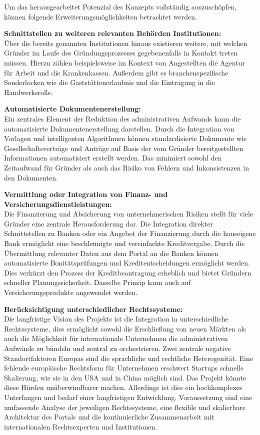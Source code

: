 Um das herausgearbeitet Potenzial des Konzepts vollständig auszuschöpfen, können folgende Erweiterungsmöglichkeiten betrachtet werden.

\textbf{Schnittstellen zu weiteren relevanten Behörden Institutionen:} \\
Über die bereits genannten Institutionen hinaus existieren weitere, mit welchen Gründer im Laufe des Gründungsprozesses gegebenenfalls in Kontakt treten müssen.
Hierzu zählen beispielsweise im Kontext von Angestellten die Agentur für Arbeit und die Krankenkassen.
Außerdem gibt es branchenspezifische Sonderlocken wie die Gaststättenerlaubnis und die Eintragung in die Handwerksrolle.

\textbf{Automatisierte Dokumentenerstellung:} \\
Ein zentrales Element der Reduktion des administrativen Aufwands kann die automatisierte Dokumentenerstellung darstellen.
Durch die Integration von Vorlagen und intelligenten Algorithmen können standardisierte Dokumente wie Gesellschaftsverträge und Anträge auf Basis der vom Gründer bereitgestellten Informationen automatisiert erstellt werden.
Das minimiert sowohl den Zeitaufwand für Gründer als auch das Risiko von Fehlern und Inkonsistenzen in den Dokumenten.

\textbf{Vermittlung oder Integration von Finanz- und Versicherungsdienstleistungen:} \\
Die Finanzierung und Absicherung von unternehmerischen Risiken stellt für viele Gründer eine zentrale Herausforderung dar.
Die Integration direkter Schnittstellen zu Banken oder ein Angebot der Finanzierung durch die hauseigene Bank ermöglicht eine beschleunigte und vereinfachte Kreditvergabe.
Durch die Übermittlung relevanter Daten aus dem Portal an die Banken können automatisierte Bonitätsprüfungen und Kreditentscheidungen ermöglicht werden. Dies verkürzt den Prozess der Kreditbeantragung erheblich und bietet Gründern schneller Planungssicherheit.
Dasselbe Prinzip kann auch auf Versicherungsprodukte angewendet werden.

\textbf{Berücksichtigung unterschiedlicher Rechtssysteme:} \\
Die langfristige Vision des Projekts ist die Integration in unterschiedliche Rechtssysteme, dies ermöglicht sowohl die Erschließung von neuen Märkten als auch die Möglichkeit für internationale Unternehmen die administrativen Aufwände zu bündeln und zentral zu orchestrieren.
Zwei zentrale negative Standortfaktoren Europas sind die sprachliche und rechtliche Heterogenität. Eine fehlende europäische Rechtsform für Unternehmen erschwert Startups schnelle Skalierung, wie sie in den USA und in China möglich sind.
Das Projekt könnte diese Hürden unüberwindbarer machen. Allerdings ist dies ein hochkomplexes Unterfangen und bedarf einer langfristigen Entwicklung. Voraussetzung sind eine umfassende Analyse der jeweiligen Rechtssysteme, eine flexible und skalierbare Architektur des Portals und die kontinuierliche Zusammenarbeit mit internationalen Rechtsexperten und Institutionen.


